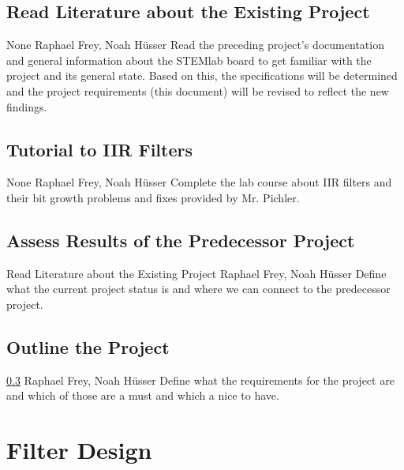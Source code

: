 \documentclass[a4paper,oneside]{alpenspecs/alpenspecs}
\begin{document}
\subsection{Read Literature about the Existing Project}
\label{subsec:general:read}

\wpac
    {}
    {}
    {}
    {None}
    {}
    {Raphael Frey, Noah Hüsser}
    {%
        Read  the preceding  project's documentation  and general  information
        about  the STEMlab  board to  get familiar  with the  project and  its
        general state. Based  on this,  the specifications will  be determined
        and  the  project requirements  (this  document)  will be  revised  to
        reflect the new findings.%
    }

\subsection{Tutorial to IIR Filters}
\label{subsec:general:iir}

\wpac
    {}
    {}
    {}
    {None}
    {}
    {Raphael Frey, Noah Hüsser}
    {%
        Complete  the  lab course  about  IIR  filters  and their  bit  growth
        problems and fixes provided by Mr. Pichler.
    }

\subsection{Assess Results of the Predecessor Project}
\label{subsec:general:assess}

\wpac
    {}
    {}
    {}
    {Read Literature about the Existing Project}
    {}
    {Raphael Frey, Noah Hüsser}
    {%
        Define what the current project status  is and where we can connect to
        the predecessor project.
    }

\subsection{Outline the Project}
\label{subsec:general:outline}

\wpac
    {}
    {}
    {}
    {\ref{subsec:general:assess}}
    {}
    {Raphael Frey, Noah Hüsser}
    {%
        Define what  the requirements for the  project are and which  of those
        are a must and which a nice to have.
    }

\section{Filter Design}
\label{sec:filters}
\end{document}

